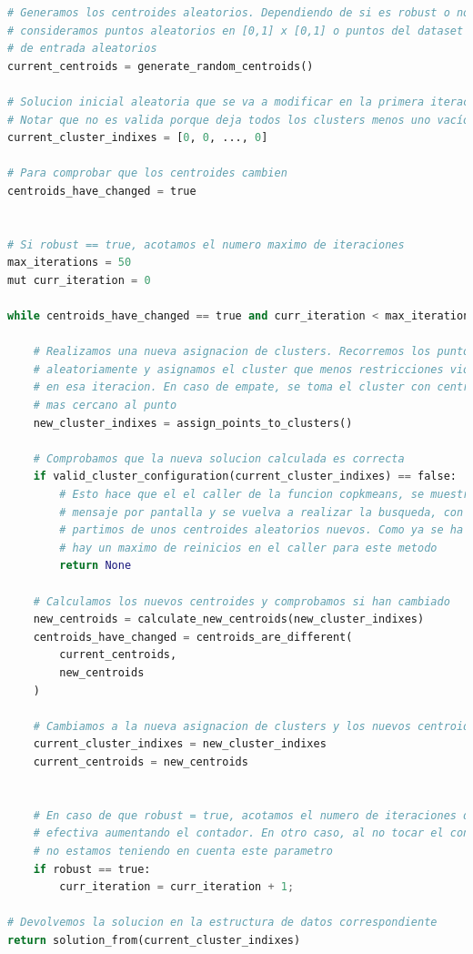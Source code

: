 \documentclass[11pt]{article}
\begin{document}
\begin{lstlisting}[language=Python, style=Boxed]
# Generamos los centroides aleatorios. Dependiendo de si es robust o no
# consideramos puntos aleatorios en [0,1] x [0,1] o puntos del dataset
# de entrada aleatorios
current_centroids = generate_random_centroids()

# Solucion inicial aleatoria que se va a modificar en la primera iteracion
# Notar que no es valida porque deja todos los clusters menos uno vacíos
current_cluster_indixes = [0, 0, ..., 0]

# Para comprobar que los centroides cambien
centroids_have_changed = true


# Si robust == true, acotamos el numero maximo de iteraciones
max_iterations = 50
mut curr_iteration = 0

while centroids_have_changed == true and curr_iteration < max_iterations{

    # Realizamos una nueva asignacion de clusters. Recorremos los puntos
    # aleatoriamente y asignamos el cluster que menos restricciones viole
    # en esa iteracion. En caso de empate, se toma el cluster con centroide
    # mas cercano al punto
    new_cluster_indixes = assign_points_to_clusters()

    # Comprobamos que la nueva solucion calculada es correcta
    if valid_cluster_configuration(current_cluster_indixes) == false:
        # Esto hace que el el caller de la funcion copkmeans, se muestre un
        # mensaje por pantalla y se vuelva a realizar la busqueda, con lo que
        # partimos de unos centroides aleatorios nuevos. Como ya se ha comentado,
        # hay un maximo de reinicios en el caller para este metodo
        return None

    # Calculamos los nuevos centroides y comprobamos si han cambiado
    new_centroids = calculate_new_centroids(new_cluster_indixes)
    centroids_have_changed = centroids_are_different(
        current_centroids,
        new_centroids
    )

    # Cambiamos a la nueva asignacion de clusters y los nuevos centroides
    current_cluster_indixes = new_cluster_indixes
    current_centroids = new_centroids


    # En caso de que robust = true, acotamos el numero de iteraciones de forma
    # efectiva aumentando el contador. En otro caso, al no tocar el contador
    # no estamos teniendo en cuenta este parametro
    if robust == true:
        curr_iteration = curr_iteration + 1;

# Devolvemos la solucion en la estructura de datos correspondiente
return solution_from(current_cluster_indixes)
\end{lstlisting}
\end{document}

